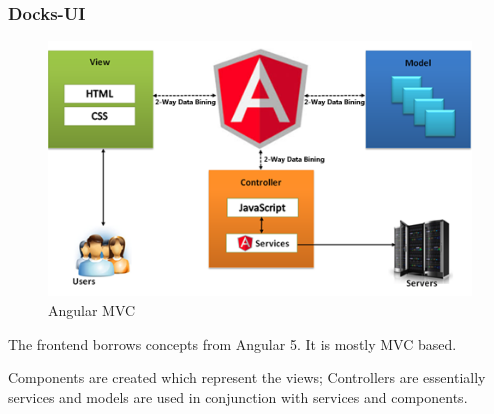 \documentclass[]{article}
\begin{document}
\subsubsection{Docks-UI}

\begin{figure}[H]
	\centering
	\includegraphics[scale=0.5]{angular.png}
	\caption{Angular MVC}
\end{figure}

The frontend borrows concepts from Angular 5. It is mostly MVC based.

Components are created which represent the views; 
Controllers are essentially services and models are used in conjunction with services and components.
\end{document}
